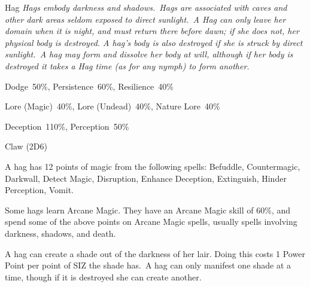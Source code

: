 \begin{monsterbox}{Hag}
	\textit{Hags embody darkness and shadows. Hags are associated with caves and other dark areas seldom exposed to direct sunlight. A Hag can only leave her domain when it is night, and must return there before dawn; if she does not, her physical body is destroyed. A hag’s body is also destroyed if she is struck by direct sunlight. A hag may form and dissolve her body at will, although if her body is destroyed it takes a Hag time (as for any nymph) to form another.}\\
	\rpghline
	\basics[%
        hitpoints  = 11, 
	majorwound = 6,
	damagemodifier = +1D6,
	powerpoints = 22,
	movementrate = 15m,
	armor = None,
	plunderrating = 3
	]
	\rpghline%
	\stats[ %
		STR = 6D6    (21),
		CON = 3D6    (11),
		DEX = 3D6    (11),
		SIZ = 3D6    (11),
		INT = 2D6+12 (19),
		POW = 2D6+21 (28),
		CHA = 1D6    (3)
	]
	\rpghline%
	\begin{rpg-monsteraction}[Resistances]
		Dodge~50\%, Persistence~60\%, Resilience~40\%
	\end{rpg-monsteraction}
	\begin{rpg-monsteraction}[Knowledge]
		Lore (Magic)~40\%, Lore (Undead)~40\%, Nature Lore~40\%
	\end{rpg-monsteraction}
	\begin{rpg-monsteraction}[Practical]
		Deception~110\%, Perception~50\%
	\end{rpg-monsteraction}
	\begin{rpg-monsteraction}
		Claw (2D6)
	\end{rpg-monsteraction}
	\begin{rpg-monsteraction}
		A hag has 12 points of magic from the following spells: Befuddle, Countermagic, Darkwall, Detect Magic, Disruption, Enhance Deception, Extinguish, Hinder Perception, Vomit.
	\end{rpg-monsteraction}
	\begin{rpg-monsteraction}
		Some hags learn Arcane Magic. They have an Arcane Magic skill of 60\%, and spend some of the above points on Arcane Magic spells, usually spells involving darkness, shadows, and death.
	\end{rpg-monsteraction}
	\begin{rpg-monsteraction}
		A hag can create a shade out of the darkness of her lair. Doing this costs 1 Power Point per point of SIZ the shade has. A hag can only manifest one shade at a time, though if it is destroyed she can create another.
	\end{rpg-monsteraction}

\end{monsterbox}

